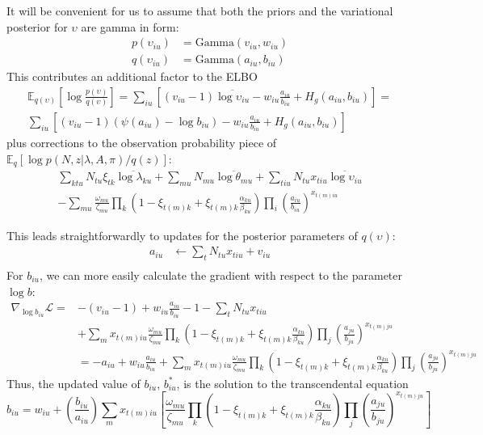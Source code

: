 \documentclass[11pt]{article}
\begin{document}
It will be convenient for us to assume that both the priors and the variational posterior for $\upsilon$ are gamma in form:
\begin{align}
    p(\upsilon_{iu}) &= \mathrm{Gamma}(v_{iu}, w_{iu}) \\
    q(\upsilon_{iu}) &= \mathrm{Gamma}(a_{iu}, b_{iu})
\end{align}
This contributes an additional factor to the ELBO
\begin{multline}
    \mathbb{E}_{q(\upsilon)} \left[ \log \frac{p(\upsilon)}{q(\upsilon)} \right] =
    \sum_{iu} \left[ (v_{iu} - 1) \overline{\log \upsilon_{iu}} - w_{iu} \frac{a_{iu}}{b_{iu}} + H_g(a_{iu}, b_{iu}) \right] =\\
    \sum_{iu} \left[ (v_{iu} - 1) (\psi(a_{iu}) - \log b_{iu}) - w_{iu} \frac{a_{iu}}{b_{iu}} + H_g(a_{iu}, b_{iu}) \right]
\end{multline}
plus corrections to the observation probability piece of $\mathbb{E}_q[\log p(N, z|\lambda, A, \pi) / q(z)]$:
\begin{multline}
    \sum_{ktu} N_{tu} \xi_{tk} \overline{\log \lambda_{ku}} + \sum_{mu} N_{mu} \overline{\log \theta_{mu}} + \sum_{tiu} N_{tu} x_{tiu} \overline{\log \upsilon_{iu}} \\
    - \sum_{mu} \frac{\omega_{mu}}{\zeta_{mu}} \prod_k \left( 1 - \xi_{t(m)k} + \xi_{t(m)k} \frac{\alpha_{ku}}{\beta_{ku}}\right)\prod_i \left(\frac{a_{iu}}{b_{iu}} \right)^{x_{t(m)iu}}
\end{multline}

This leads straightforwardly to updates for the posterior parameters of $q(\upsilon)$:
\begin{align}
    a_{iu} &\leftarrow \sum_t N_{tu} x_{tiu} + v_{iu} \\
\end{align}
For $b_{iu}$, we can more easily calculate the gradient with respect to the parameter $\log b$:
\begin{align}
    \nabla_{\log b_{iu}} \mathcal{L} = &-(v_{iu} - 1) +
    w_{iu} \frac{a_{iu}}{b_{iu}} - 1 - \sum_t N_{tu} x_{tiu} \\
    & + \sum_m x_{t(m)iu} \frac{\omega_{mu}}{\zeta_{mu}}
    \prod_k \left(1 - \xi_{t(m)k} + \xi_{t(m)k}
    \frac{\alpha_{ku}}{\beta_{ku}}\right)
    \prod_j \left(\frac{a_{ju}}{b_{ju}}\right)^{x_{t(m)ju}} \\
    &= -a_{iu} + w_{iu} \frac{a_{iu}}{b_{iu}}
    + \sum_m x_{t(m)iu} \frac{\omega_{mu}}{\zeta_{mu}}
    \prod_k \left(1 - \xi_{t(m)k} + \xi_{t(m)k}
    \frac{\alpha_{ku}}{\beta_{ku}}\right)
    \prod_j \left(\frac{a_{ju}}{b_{ju}}\right)^{x_{t(m)ju}}
\end{align}
Thus, the updated value of $b_{iu}$, $b^*_{iu}$, is the solution to the transcendental equation
\begin{equation}
    b_{iu} = w_{iu} + \left( \frac{b_{iu}}{a_{iu}}\right) \sum_{m} x_{t(m)iu}\left[ \frac{\omega_{mu}}{\zeta_{mu}} \prod_k \left( 1 - \xi_{t(m)k} + \xi_{t(m)k} \frac{\alpha_{ku}}{\beta_{ku}}\right)\prod_{j} \left(\frac{a_{ju}}{b_{ju}} \right)^{x_{t(m)ju}} \right]
\end{equation}
\end{document}

